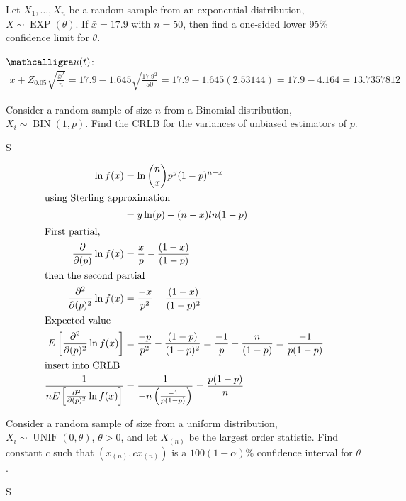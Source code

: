 \documentclass[answers]{exam}
\begin{document}
\begin{questions}
\question 
Let \(X_1,\ldots,X_n\) be a random sample from an exponential distribution,
\(X\sim\operatorname{EXP}(\theta)\). 
If \(\bar{x}=17.9\) with \(n=50\), then find a one-sided lower 95\%
confidence limit for \(\theta\).
\begin{solution}
	\(\mathcalligra u(t)\):
	\begin{align*}
		\bar{x} + Z_{0.05}\sqrt{\frac{\bar{x}^2}{n}} 
		= 17.9 - 1.645\sqrt{\frac{17.9^2}{50}} 
		= 17.9 - 1.645(2.53144)
		= 17.9 - 4.164%
		= 13.7357812 
	\end{align*}
\end{solution}

\question 
Consider a random sample of size \(n\) from a Binomial distribution,
\(X_i\sim\operatorname{BIN}(1,p)\). 
Find the CRLB for the variances of unbiased estimators of \(p\).
\begin{solution}
	S
	
	\begin{align*}
		\ln f(x) &= \ln\binom{n}{x}p^y(1-p)^{n-x} \\
		\intertext{using Sterling approximation}
			&= y \ln(p) + (n-x)ln(1-p) \\
	\intertext{First partial,}
		\frac{\partial}{\partial(p)}\ln f(x) &= \frac{x}{p} -\frac{(1-x)}{(1-p)} \\
	\intertext{then the second partial}
		\frac{\partial^2}{\partial(p)^2}\ln f(x)
			&= \frac{-x}{p^2} -\frac{(1-x)}{(1-p)^2} \\
	\intertext{Expected value}
		E\left[\frac{\partial^2}{\partial(p)^2}\ln f(x)\right]
		&= \frac{-p}{p^2} -\frac{(1-p)}{(1-p)^2}
		= \frac{-1}{p} -\frac{n}{(1-p)} 
		= \frac{-1}{p(1-p)} \\
	\intertext{insert into CRLB}
		\frac{1}{nE\left[\frac{\partial^2}{\partial(p)^2}\ln f(x)\right]}
		&= \frac{1}{-n\left(\frac{-1}{p(1-p)}\right)}
		= \frac{p(1-p)}{n}
	\end{align*}
\end{solution}

\question 
Consider a random sample of size from a uniform distribution,
\(X_i\sim\operatorname{UNIF}(0,\theta)\), \(\theta>0\),
and let \(X_{(n)}\) be the largest order statistic. 
Find constant \(c\) such that \((x_{(n)},cx_{(n)})\) is a \(100(1-\alpha)\%\) 
confidence interval for \(\theta\).
\begin{solution}
	S
\end{solution}


\end{questions}
\end{document}
